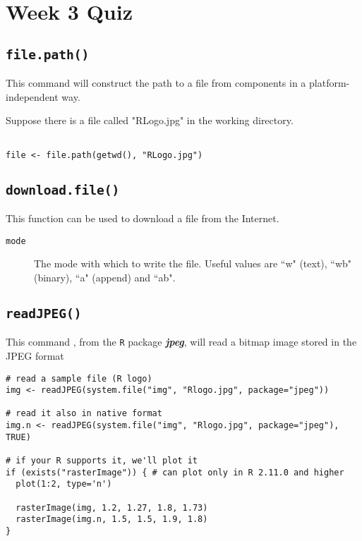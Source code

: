 \documentclass[]{article}
\begin{document}
\section{Week 3 Quiz}

\subsection*{\texttt{file.path()}}

This command will construct the path to a file from components in a platform-independent way. 

Suppose there is a file called "RLogo.jpg" in the working directory.
\begin{framed}
\begin{verbatim}

file <- file.path(getwd(), "RLogo.jpg")

\end{verbatim}
\end{framed}
\subsection*{\texttt{download.file()}}

This function can be used to download a file from the Internet. 

\begin{description}
\item[\texttt{mode}] The mode with which to write the file. Useful values are ``w" (text), ``wb" (binary), ``a" (append) and ``ab".
\end{description}

\subsection*{\texttt{readJPEG()}}

This command , from the \texttt{R} package \textbf{\textit{jpeg}}, will read a bitmap image stored in the JPEG format 
\begin{framed}
\begin{verbatim}
# read a sample file (R logo)
img <- readJPEG(system.file("img", "Rlogo.jpg", package="jpeg"))
 
# read it also in native format
img.n <- readJPEG(system.file("img", "Rlogo.jpg", package="jpeg"), TRUE)
 
# if your R supports it, we'll plot it
if (exists("rasterImage")) { # can plot only in R 2.11.0 and higher
  plot(1:2, type='n')
 
  rasterImage(img, 1.2, 1.27, 1.8, 1.73)
  rasterImage(img.n, 1.5, 1.5, 1.9, 1.8)
}
\end{verbatim}
\end{framed}
\end{document}
